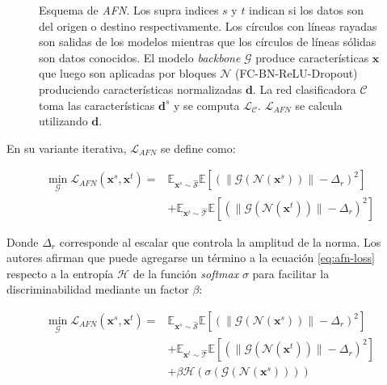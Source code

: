 \begin{figure}[H]
    \caption{Esquema de {\it AFN}. Los supra indices $s$ y $t$ indican si los datos son del origen o destino respectivamente.
    Los círculos con líneas rayadas son salidas de los modelos mientras que los círculos de líneas sólidas son datos conocidos. El modelo {\it backbone} $\mathcal{G}$ produce características $\mathbf{x}$ que luego son aplicadas por bloques $\mathcal{N}$ (FC-BN-ReLU-Dropout) produciendo características normalizadas $\mathbf{d}$. La red clasificadora $\mathcal{C}$ toma las características $\mathbf{d}^s$ y se computa $\mathcal{L}_{\mathcal{C}}$. $\mathcal{L}_{AFN}$ se calcula utilizando $\mathbf{d}$.}
    \label{fig:afn-esquema}
\end{figure}

En su variante iterativa, $\mathcal{L}_{AFN}$ se define como:

\begin{align}
    \min_{\mathcal{G}} \mathcal{L}_{AFN}(\mathbf{x}^s, \mathbf{x}^t) = & \mathbb{E}_{\mathbf{x}^s \sim \mathcal{\hat{S}}} \mathbb{E}[(\| \mathcal{G}(\mathcal{N}(\mathbf{x}^s)) \| - \Delta_r)^2] \nonumber \\
                                                                       & + \mathbb{E}_{\mathbf{x}^t \sim \mathcal{\hat{T}}} \mathbb{E}[(\| \mathcal{G}(\mathcal{N}(\mathbf{x}^t)) \| - \Delta_r)^2]
    \label{eq:afn-loss}
\end{align}

Donde $\Delta_r$ corresponde al escalar que controla la amplitud de la norma. Los autores afirman que puede agregarse
un término a la ecuación \ref{eq:afn-loss} respecto a la entropía $\mathcal{H}$ de la función {\it softmax} $\sigma$
para facilitar la discriminabilidad mediante un factor $\beta$:

\begin{align}
    \min_{\mathcal{G}} \mathcal{L}_{AFN}(\mathbf{x}^s, \mathbf{x}^t) = & \mathbb{E}_{\mathbf{x}^s \sim \mathcal{\hat{S}}} \mathbb{E}[(\| \mathcal{G}(\mathcal{N}(\mathbf{x}^s)) \| - \Delta_r)^2] \nonumber   \\
                                                                       & + \mathbb{E}_{\mathbf{x}^t \sim \mathcal{\hat{T}}} \mathbb{E}[(\| \mathcal{G}(\mathcal{N}(\mathbf{x}^t)) \| - \Delta_r)^2] \nonumber \\
                                                                       & + \beta \mathcal{H}(\sigma(\mathcal{G}(\mathcal{N}(\mathbf{x}^s)) ))
    \label{eq:afn-loss-entropy}
\end{align}

